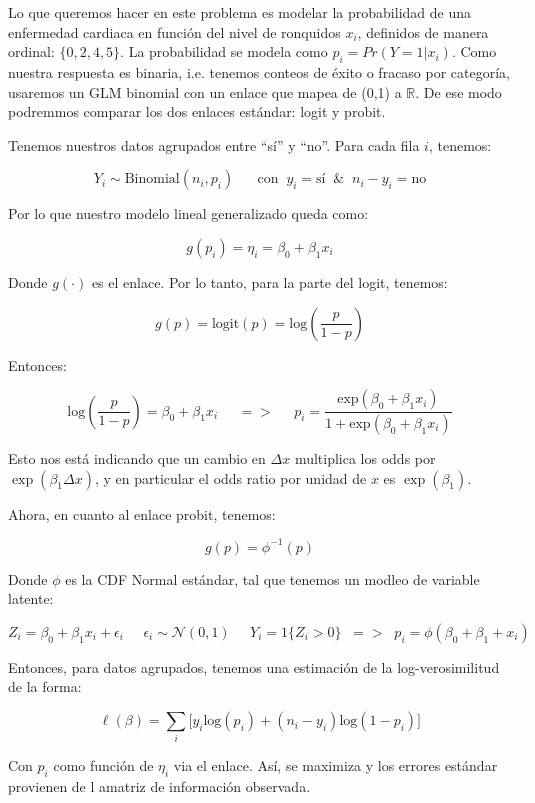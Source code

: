 Lo que queremos hacer en este problema es modelar la probabilidad de una enfermedad cardiaca en función 
del nivel de ronquidos $x_i$, definidos de manera ordinal: $\{0,2,4,5\}$. La probabilidad se modela como
$p_i = Pr(Y=1 | x_i)$. Como nuestra respuesta es binaria, i.e. tenemos conteos de éxito o fracaso por 
categoría, usaremos un GLM binomial con un enlace que mapea de (0,1) a $\mathbb{R}$. De ese modo 
podremmos comparar los dos enlaces estándar: logit y probit. 

Tenemos nuestros datos agrupados entre ``sí'' y ``no''. Para cada fila $i$, tenemos:

\[
    Y_i \sim \text{Binomial}(n_i, p_i) \;\;\;\;\;\; \text{con} \;\; y_i = \text{sí} \;\; \& \;\; n_i - y_i = \text{no}
\]

Por lo que nuestro modelo lineal generalizado queda como:

\[
    g(p_i) = \eta_i = \beta_0 + \beta_1 x_i
\]

Donde $g(\cdot)$ es el enlace. Por lo tanto, para la parte del logit, tenemos:

\[
    g(p) = \text{logit}(p) = \text{log}(\frac{p}{1-p})
\]

Entonces:

\[
    \text{log}(\frac{p}{1-p}) = \beta_0 + \beta_1 x_i \;\;\;\;\; => \;\;\;\;\; p_i = \frac{\text{exp}(\beta_0 + \beta_1 x_i)}{1 + \text{exp}(\beta_0 + \beta_1 x_i)}
\]

Esto nos está indicando que un cambio en $\Delta x$ multiplica los odds por $\exp(\beta_1 \Delta x)$, y 
en particular el odds ratio por unidad de $x$ es $\exp(\beta_1)$.

Ahora, en cuanto al enlace probit, tenemos:

\[
    g(p) = \phi^{-1}(p)
\]

Donde $\phi$ es la CDF Normal estándar, tal que tenemos un modleo de variable latente:

\[
    Z_i = \beta_0 + \beta_1 x_i + \epsilon_i \;\;\;\;\; \epsilon_i \sim \mathcal{N}(0,1) \;\;\;\;\; Y_i = 1\{Z_i > 0\} \;\; => \;\; p_i = \phi(\beta_0+\beta_1 + x_i)
\]

Entonces, para datos agrupados, tenemos una estimación de la log-verosimilitud de la forma:

\[
    \ell(\beta) = \sum_{i} \big[ y_i \text{log}(p_i) + (n_i - y_i) \text{log}(1-p_i) \big]
\]

Con $p_i$ como función de $\eta_i$ via el enlace. Así, se maximiza y los errores estándar provienen
de l amatriz de información observada. 

